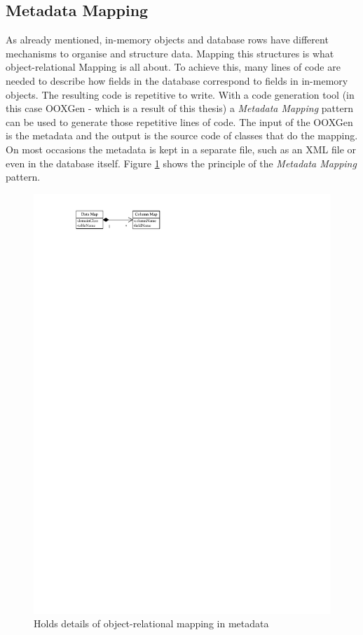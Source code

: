 		\subsection{Metadata Mapping}
		\label{subsec:metadataMapping}
			As already mentioned, in-memory objects and database rows have different mechanisms to
			organise and structure data. Mapping this structures is what object-relational Mapping 
			is all about. To achieve this, many lines of code are needed to describe how fields in
			the database correspond to fields in in-memory objects. The resulting code
			is repetitive to write. With a code generation tool (in this case OOXGen - which is a result of this 
			thesis) a \textit{Metadata Mapping} pattern can be used to generate those repetitive lines of code.
			The input of the OOXGen is the metadata and the output is the source code of classes that do 
			the mapping. On most occasions the metadata is kept in a separate file, such as an XML file or
			even in the database itself. Figure \ref{fig:patternsMetadataMapping} shows the principle of the
			\textit{Metadata Mapping} pattern.
			
			\begin{figure}[htb]
				\begin{center}
					\includegraphics{./files/inc/figures/patternsMetadataMapping}
					\caption[Metadata Mapping principle]{\label{fig:patternsMetadataMapping} Holds details of object-relational mapping in metadata}
				\end{center}
			\end{figure}
			
